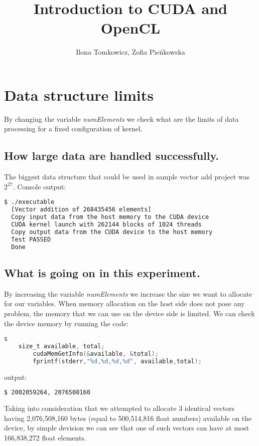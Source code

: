\documentclass[12pt]{article}
\begin{document}
\title{Introduction to CUDA and OpenCL}
\author{Ilona Tomkowicz, Zofia Pieńkowska}

\maketitle
\tableofcontents
\newpage

\section{Data structure limits} 
By changing the variable \textit{numElements} we check what are the limits of data processing for a fixed configuration of kernel.
\subsection{How large data are handled successfully.} 
The biggest data structure that could be used in sample vector add project was $2^{\text{27}}$.
\noindent Console output:
\begin{lstlisting}[language=bash]
  $ ./executable
  [Vector addition of 268435456 elements]
  Copy input data from the host memory to the CUDA device
  CUDA kernel launch with 262144 blocks of 1024 threads
  Copy output data from the CUDA device to the host memory
  Test PASSED
  Done
\end{lstlisting}

\subsection{What is going on in this experiment.}
By increasing the variable \textit{numElements} we increase the size we want to allocate for our variables. When memory allocation on the host side does not pose any problem, the memory that we can use on the device side is limited. We can check the device memory by running the code:
\begin{lstlisting}[language=C]s
	size_t available, total;
        cudaMemGetInfo(&available, &total);
        fprintf(stderr,"%d,%d,%d,%d", available,total);
\end{lstlisting}
output:
\begin{lstlisting}[language=bash]
  $ 2002059264, 2076508160
\end{lstlisting}
Taking into consideration that we attempted to allocate 3 identical vectors having 2,076,508,160  bytes (equal to 500,514,816 float numbers) available on the device, by simple devision we can see that one of such vectors can have at most 166,838,272 float elements. 
\end{document}
